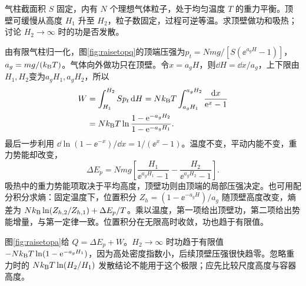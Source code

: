 \begin{example}[有限气柱的等温升顶做功]
气柱截面积 $S$ 固定，内有 $N$ 个理想气体粒子，处于均匀温度 $T$ 的重力平衡。顶壁可缓慢从高度 $H_1$ 升至 $H_2$，粒子数固定，过程可逆等温。求顶壁做功和吸热；讨论 $H_2\to\infty$ 时的功是否发散。
\end{example}
\begin{solution}
由有限气柱归一化，图\ref{fig:raisetopq}的顶端压强为$p_t=Nmg/[S(\ee^{a_gH}-1)]$，$a_g=mg/(k_{\mathrm B} T)$。气体向外做功只在顶壁。令$x=a_gH$，则$\dd H=\dd x/a_g$，上下限由$H_1,H_2$变为$a_gH_1,a_gH_2$，所以
\begin{align*}
 W&=\int_{H_1}^{H_2}Sp_t\mathop{}\!\mathrm d H
 =Nk_{\mathrm B} T\int_{a_gH_1}^{a_gH_2}\frac{\mathop{}\!\mathrm d x}{\mathrm e^x-1}\\
 &=Nk_{\mathrm B} T\ln\frac{1-\mathrm e^{-a_gH_2}}{1-\mathrm e^{-a_gH_1}}.
\end{align*}
最后一步利用 $\dd\ln(1-\ee^{-x})/\dd x=1/(\ee^x-1)$。温度不变，平动内能不变，重力势能却改变，
\[
 \Delta E_p=Nmg\left[\frac{H_1}{\ee^{a_gH_1}-1}
 -\frac{H_2}{\ee^{a_gH_2}-1}\right].
\]
吸热中的重力势能项取决于平均高度，顶壁功则由顶端的局部压强决定。也可用配分积分求熵：固定温度下，位置积分 $Z_h=(1-\ee^{-a_gH})/a_g$ 随顶壁高度改变，熵差为 $Nk_{\mathrm B}\ln(Z_{h,2}/Z_{h,1})+\Delta E_p/T$。乘以温度，第一项给出顶壁功，第二项给出势能增量，与第一定律一致。位置积分在无限高时收敛，功也趋于有限值。

图\ref{fig:raisetopa}给 $Q=\Delta E_p+W$。$H_2\to\infty$ 时功趋于有限值 $-Nk_{\mathrm B} T\ln(1-\mathrm e^{-a_gH_1})$，因为高处密度指数小，后续顶壁压强很快趋零。忽略重力时的 $Nk_{\mathrm B} T\ln(H_2/H_1)$ 发散结论不能用于这个极限；应先比较尺度高度与容器高度。
\end{solution}

